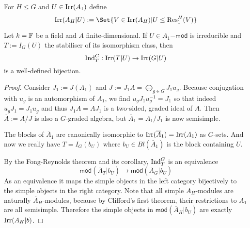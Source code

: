 \begin{definition}
For $H\leq G$ and $U\in\operatorname{Irr}(A_1)$ define
\[\Irr(A_H | U) := \Set{V\in\Irr(A_H) | U \leq \Res_1^H(V)}\]
\end{definition}

\begin{theorem}
Let $k=\mathbb{F}$ be a field and $A$ finite-dimensional. If $U\in A_1\mathsf{-mod}$ is irreducible and $T:=I_G(U)$ the stabiliser of its isomorphism class, then
\[\operatorname{Ind}_T^G: \operatorname{Irr}(T | U) \to \operatorname{Irr}(G | U)\]
is a well-defined bijection.
\end{theorem}
\begin{proof}
Consider $J_1:=J(A_1)$ and $J:=J_1 A=\bigoplus_{g\in G} J_1 u_g$. Because conjugation with $u_g$ is an automorphism of $A_1$, we find $u_g J_1 u_g^{-1} = J_1$ so that indeed $u_g J_1 = J_1 u_g$ and thus $J_1 A=A J_1$ is a two-sided, graded ideal of $A$. Then $\overline{A} := A/J$ is also a $G$-graded algebra, but $\overline{A}_1=A_1/J_1$ is now semisimple.

\medbreak
The blocks of $\overline{A}_1$ are canonically isomorphic to $\operatorname{Irr}(\overline{A}_1)=\operatorname{Irr}(A_1)$ as $G$-sets. And now we really have $T=I_G(b_U)$ where $b_U\in Bl(\overline{A}_1)$ is the block containing $U$.

\medbreak
By the Fong-Reynolds theorem and its corollary, $\operatorname{Ind}_T^G$ is an equivalence
\[\mathsf{mod}(\overline{A}_T|b_U) \to \mathsf{mod}(\overline{A}_G|b_U)\]
As an equivalence it maps the simple objects in the left category bijectively to the simple objects in the right category. Note that all simple $A_H$-modules are naturally $\overline{A}_H$-modules, because by Clifford's first theorem, their restrictions to $A_1$ are all semisimple. Therefore the simple objects in $\mathsf{mod}(\overline{A}_H|b_U)$ are exactly $\operatorname{Irr}(A_H|b)$.
\end{proof}